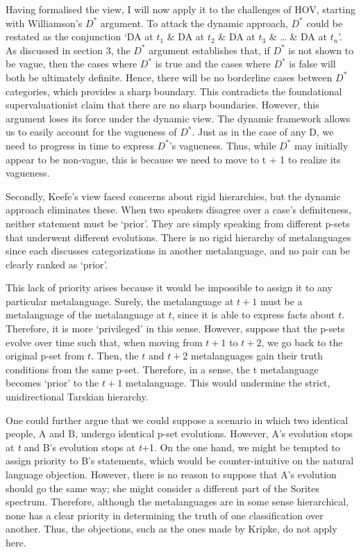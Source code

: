 Having formalised the view, I will now apply it to the challenges of
HOV, starting with Williamson's $D^*$ argument. To attack the dynamic
approach, $D^*$ could be restated as the conjunction `DA at \(t_{1}\) \& DA
at \(t_{2}\) \& DA at \(t_{3}\) \& \ldots{} \& DA at \(t_{n}\)'. As
discussed in section 3, the $D^*$ argument establishes that, if $D^*$ is not
shown to be vague, then the cases where $D^*$ is true and the cases where
$D^*$ is false will both be ultimately definite. Hence, there will be no
borderline cases between $D^*$ categories, which provides a sharp boundary.
This contradicts the foundational supervaluationist claim that there are
no sharp boundaries. However, this argument loses its force under the
dynamic view. The dynamic framework allows us to easily account for the
vagueness of $D^*$. Just as in the case of any D, we need to progress in
time to express $D^*$'s vagueness. Thus, while $D^*$ may initially appear to
be non-vague, this is because we need to move to t + 1 to realize its
vagueness.

Secondly, Keefe's view faced concerns about rigid hierarchies, but the
dynamic approach eliminates these. When two speakers disagree over a
case's definiteness, neither statement must be `prior'. They are simply
speaking from different p-sets that underwent different evolutions.
There is no rigid hierarchy of metalanguages since each discusses
categorizations in another metalanguage, and no pair can be clearly
ranked as `prior'.

This lack of priority arises because it would be impossible to assign it
to any particular metalanguage. Surely, the metalanguage at $t+1$
must be a metalanguage of the metalanguage at $t$, since it is able
to express facts about $t$. Therefore, it is more `privileged' in
this sense. However, suppose that the p-sets evolve over time such that,
when moving from $t+1$ to $t+2$, we go back to the original
p-set from $t$. Then, the $t$ and $t+2$ metalanguages
gain their truth conditions from the same p-set. Therefore, in a sense,
the t metalanguage becomes `prior' to the $t+1$ metalanguage. This
would undermine the strict, unidirectional Tarskian hierarchy.

One could further argue that we could suppose a scenario in which two
identical people, A and B, undergo identical p-set evolutions. However,
A's evolution stops at \emph{t} and B's evolution stops at \emph{t}+1.
On the one hand, we might be tempted to assign priority to B's
statements, which would be counter-intuitive on the natural language
objection. However, there is no reason to suppose that A's evolution
should go the same way; she might consider a different part of the
Sorites spectrum. Therefore, although the metalanguages are in some
sense hierarchical, none has a clear priority in determining the truth
of one classification over another. Thus, the objections, such as the
ones made by Kripke, do not apply here.

